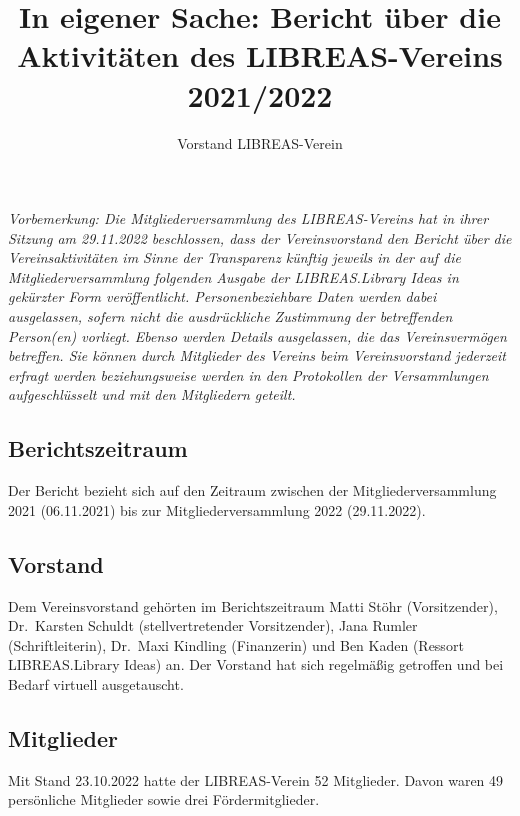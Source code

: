 \documentclass[a4paper,
fontsize=11pt,
oneside,
numbers=noperiodatend,
parskip=half-,
bibliography=totoc,
final
]{scrartcl}
\title{\LARGE{In eigener Sache: Bericht über die Aktivitäten des LIBREAS-Vereins 2021/2022}}%
\author{Vorstand LIBREAS-Verein} %
\date{}
\begin{document}
\maketitle
\thispagestyle{fancyplain} 


\emph{Vorbemerkung: Die Mitgliederversammlung des LIBREAS-Vereins hat in
ihrer Sitzung am 29.11.2022 beschlossen, dass der Vereinsvorstand den
Bericht über die Vereinsaktivitäten im Sinne der Transparenz künftig
jeweils in der auf die Mitgliederversammlung folgenden Ausgabe der
LIBREAS.Library Ideas in gekürzter Form veröffentlicht.
Personenbeziehbare Daten werden dabei ausgelassen, sofern nicht die
ausdrückliche Zustimmung der betreffenden Person(en) vorliegt. Ebenso
werden Details ausgelassen, die das Vereinsvermögen betreffen. Sie
können durch Mitglieder des Vereins beim Vereinsvorstand jederzeit
erfragt werden beziehungsweise werden in den Protokollen der
Versammlungen aufgeschlüsselt und mit den Mitgliedern geteilt.}

\hypertarget{berichtszeitraum}{%
\subsection{Berichtszeitraum}\label{berichtszeitraum}}

Der Bericht bezieht sich auf den Zeitraum zwischen der
Mitgliederversammlung 2021 (06.11.2021) bis zur Mitgliederversammlung
2022 (29.11.2022).

\hypertarget{vorstand}{%
\subsection{Vorstand}\label{vorstand}}

Dem Vereinsvorstand gehörten im Berichtszeitraum Matti Stöhr
(Vorsitzender), Dr.~Karsten Schuldt (stellvertretender Vorsitzender),
Jana Rumler (Schriftleiterin), Dr.~Maxi Kindling (Finanzerin) und Ben
Kaden (Ressort LIBREAS.Library Ideas) an. Der Vorstand hat sich
regelmäßig getroffen und bei Bedarf virtuell ausgetauscht.

\hypertarget{mitglieder}{%
\subsection{Mitglieder}\label{mitglieder}}

Mit Stand 23.10.2022 hatte der LIBREAS-Verein 52 Mitglieder. Davon waren
49 persönliche Mitglieder sowie drei Fördermitglieder.
\end{document}
